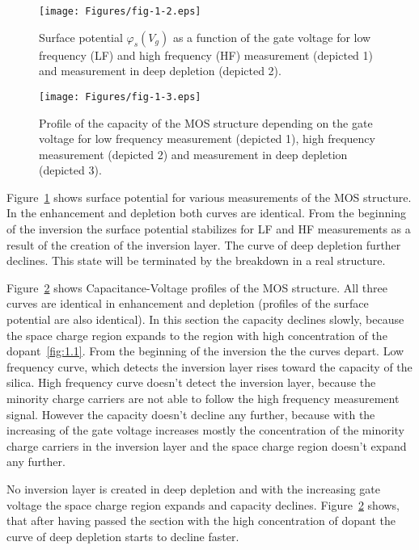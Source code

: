 \newpage
\begin{figure}[h!]\centering
  \texttt{[image: Figures/fig-1-2.eps]}
  \caption[Surface potential $\varphi_s(V_g)$ as a function of the
    gate voltage]{Surface potential $\varphi_s(V_g)$ as a function of
    the gate voltage for low frequency (LF) and high frequency (HF)
    measurement (depicted 1) and measurement in deep depletion
    (depicted 2).}\label{fig:1.2}
\end{figure}

\begin{figure}[h!]\centering
  \texttt{[image: Figures/fig-1-3.eps]}
  \caption[Profile of the capacity of the MOS structure depending on
    the gate voltage]{Profile of the capacity of the MOS structure
    depending on the gate voltage for low frequency measurement
    (depicted 1), high frequency measurement (depicted 2) and
    measurement in deep depletion (depicted 3).}\label{fig:1.3}
\end{figure}

\par Figure~\ref{fig:1.2} shows surface potential for various
measurements of the MOS structure. In the enhancement and depletion
both curves are identical. From the beginning of the inversion the
surface potential stabilizes for LF and HF measurements as a result of
the creation of the inversion layer. The curve of deep depletion
further declines. This state will be terminated by the breakdown in a
real structure.

\par Figure~\ref{fig:1.3} shows Capacitance-Voltage profiles of the
MOS structure. All three curves are identical in enhancement and
depletion (profiles of the surface potential are also identical). In
this section the capacity declines slowly, because the space charge
region expands to the region with high concentration of the
dopant~\ref{fig:1.1}. From the beginning of the inversion the the
curves depart. Low frequency curve, which detects the inversion layer
rises toward the capacity of the silica. High frequency curve doesn't
detect the inversion layer, because the minority charge carriers are
not able to follow the high frequency measurement signal. However the
capacity doesn't decline any further, because with the increasing of
the gate voltage increases mostly the concentration of the minority
charge carriers in the inversion layer and the space charge region
doesn't expand any further.

\par No inversion layer is created in deep depletion and with the
increasing gate voltage the space charge region expands and capacity
declines. Figure~\ref{fig:1.3} shows, that after having passed the
section with the high concentration of dopant the curve of deep
depletion starts to decline faster.

